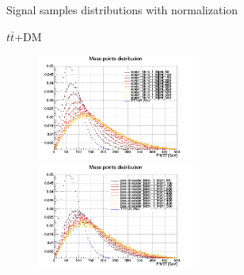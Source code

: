 \documentclass[8pt]{beamer}
\begin{document}
\begin{frame}{Signal samples distributions with normalization}
\vspace{-5pt}
\begin{block}{\centering $t \bar t$+DM}\end{block} \vspace{-10pt}
\begin{figure}[htbp]
\centering
\begin{minipage}[b]{.49\textwidth}
\begin{center}
\includegraphics[width=5.2cm, height=3.5cm]{figs/scalarMETmChi1Norm.png}
\end{center}
\end{minipage}\hfill
\begin{minipage}[b]{.49\textwidth}
\begin{center}
\includegraphics[width=5.2cm, height=3.5cm]{figs/pseudoscalarMETmChi1Norm.png}
\end{center}
\end{minipage} \hfill
\end{figure} \vfill
\end{frame}
\end{document}
